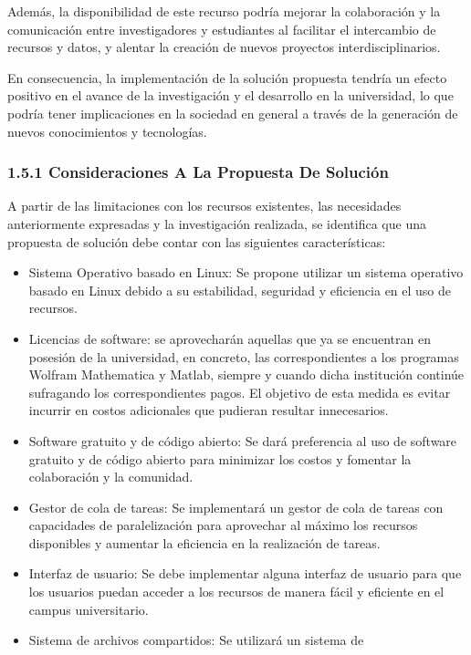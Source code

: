 \begin{spacing}{1.5}
  Además, la disponibilidad de este recurso podría mejorar la colaboración y
  la comunicación entre investigadores y estudiantes al facilitar el intercambio
  de recursos y datos, y alentar la creación de nuevos proyectos
  interdisciplinarios.

  En consecuencia, la implementación de la solución propuesta tendría un
  efecto positivo en el avance de la investigación y el desarrollo en la
  universidad, lo que podría tener implicaciones en la sociedad en general a
  través de la generación de nuevos conocimientos y tecnologías.

  \subsubsection{1.5.1 Consideraciones A La Propuesta De Solución}
  A partir de las limitaciones con los recursos existentes, las necesidades
  anteriormente expresadas y la investigación realizada, se identifica que una
  propuesta de solución debe contar con las siguientes características:
  \begin{itemize}
    \item Sistema Operativo basado en Linux: Se propone utilizar un sistema
          operativo basado en Linux debido a su estabilidad, seguridad y eficiencia en el
          uso de recursos.
    \item Licencias de software: se aprovecharán aquellas que ya se
          encuentran en posesión de la universidad, en concreto, las correspondientes a
          los programas Wolfram Mathematica y Matlab, siempre y cuando dicha institución
          continúe sufragando los correspondientes pagos. El objetivo de esta medida es
          evitar incurrir en costos adicionales que pudieran resultar innecesarios.
    \item Software gratuito y de código abierto: Se dará preferencia al uso
          de software gratuito y de código abierto para minimizar los costos y fomentar
          la colaboración y la comunidad.
    \item Gestor de cola de tareas: Se implementará un gestor de cola de
          tareas con capacidades de paralelización para aprovechar al máximo los recursos
          disponibles y aumentar la eficiencia en la realización de tareas.
    \item Interfaz de usuario: Se debe implementar alguna interfaz de usuario
          para que los usuarios puedan acceder a los recursos de manera fácil y eficiente
          en el campus universitario.
    \item Sistema de archivos compartidos: Se utilizará un sistema de

\end{itemize}
\end{spacing}

